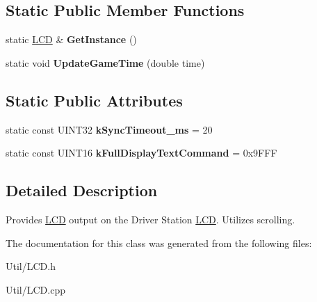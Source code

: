 \subsection*{\-Static \-Public \-Member \-Functions}
\begin{DoxyCompactItemize}
\item 
\hypertarget{class_l_c_d_a9652b3ec57faa3ba2a9f8032e0c5ce09}{static \hyperlink{class_l_c_d}{\-L\-C\-D} \& {\bfseries \-Get\-Instance} ()}\label{class_l_c_d_a9652b3ec57faa3ba2a9f8032e0c5ce09}

\item 
\hypertarget{class_l_c_d_ae222daaf0f64992bdc903635a20c75ae}{static void {\bfseries \-Update\-Game\-Time} (double time)}\label{class_l_c_d_ae222daaf0f64992bdc903635a20c75ae}

\end{DoxyCompactItemize}
\subsection*{\-Static \-Public \-Attributes}
\begin{DoxyCompactItemize}
\item 
\hypertarget{class_l_c_d_a5ab97166e7dd0ba18bddf62faefe618f}{static const \-U\-I\-N\-T32 {\bfseries k\-Sync\-Timeout\-\_\-ms} = 20}\label{class_l_c_d_a5ab97166e7dd0ba18bddf62faefe618f}

\item 
\hypertarget{class_l_c_d_a52ba7ce67df98f2b8fb45995639d0f14}{static const \-U\-I\-N\-T16 {\bfseries k\-Full\-Display\-Text\-Command} = 0x9\-F\-F\-F}\label{class_l_c_d_a52ba7ce67df98f2b8fb45995639d0f14}

\end{DoxyCompactItemize}


\subsection{\-Detailed \-Description}
\-Provides \hyperlink{class_l_c_d}{\-L\-C\-D} output on the \-Driver \-Station \hyperlink{class_l_c_d}{\-L\-C\-D}. \-Utilizes scrolling. 

\-The documentation for this class was generated from the following files\-:\begin{DoxyCompactItemize}
\item 
\-Util/\-L\-C\-D.\-h\item 
\-Util/\-L\-C\-D.\-cpp\end{DoxyCompactItemize}
